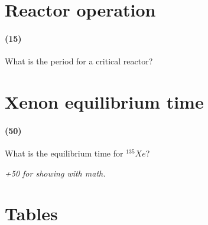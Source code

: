 \documentclass[11pt,a4paper]{article}
\makeatletter
\renewcommand\listoftables{%
    \@starttoc{lot}%
}
\makeatother
\begin{document}
\newpage

\section{Reactor operation}
\paragraph*{(15)}
What is the period for a critical reactor?





\newpage

\section{Xenon equilibrium time}
\paragraph*{(50)}
What is the equilibrium time for $^{135}Xe$? 

\vspace{\baselineskip}

\textit{+50 for showing with math.}





\newpage

\section*{Tables}

{%
\let\oldnumberline\numberline%
\renewcommand{\numberline}{\tablename~\oldnumberline}%
\listoftables%
}

\newpage

\end{document}
